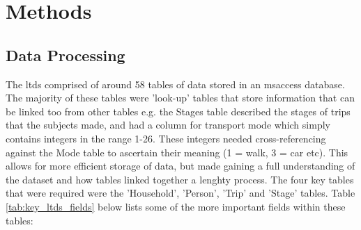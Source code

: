\section{Methods}
\label{sec:1_methods}

\subsection{Data Processing}
\label{sec:reconstruction_data_processing}

The \gls{ltds} comprised of around 58 tables of data stored in an \gls{msaccess} database. The majority of these tables were 'look-up' tables that store information that can be linked too from other tables e.g. the Stages table described the stages of trips that the subjects made, and had a column for transport mode which simply contains integers in the range 1-26. These integers needed cross-referencing against the Mode table to ascertain their meaning (1 = walk, 3 = car etc). This allows for more efficient storage of data, but made gaining a full understanding of the dataset and how tables linked together a lenghty process. The four key tables that were required were the 'Household', 'Person', 'Trip' and 'Stage' tables. Table \ref{tab:key_ltds_fields} below lists some of the more important fields within these tables:

\newpage

